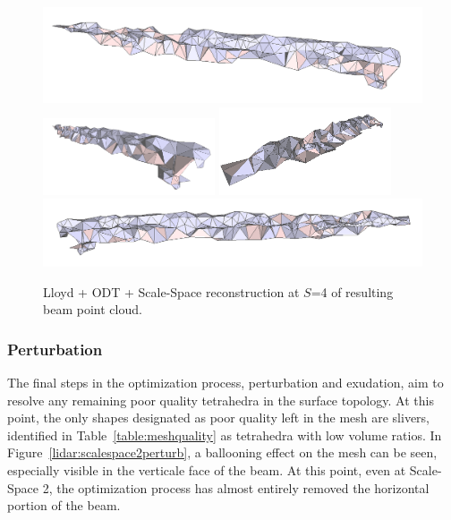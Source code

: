 \documentclass[12pt]{drexelthesis}
\let\Oldsubsubsection\subsubsection
\renewcommand{\subsubsection}{\FloatBarrier\Oldsubsubsection}
\begin{document}
\begin{figure}[!ht]
	\centering
		\includegraphics[width=5in]{real-lab-scans/optimizedNeat/scalespace4odt00.png}
		\includegraphics[width=2in]{real-lab-scans/optimizedNeat/scalespace4odt01.png}
		\includegraphics[width=2in]{real-lab-scans/optimizedNeat/scalespace4odt02.png}
		\includegraphics[width=5in]{real-lab-scans/optimizedNeat/scalespace4odt03.png}
		\caption[Lloyd + ODT + Scale-Space reconstruction at $S$=4 of segmented LiDAR data]{\centering Lloyd + ODT + Scale-Space reconstruction at $S$=4 of resulting beam point cloud.}
	\label{lidar:scalespace4odt}
\end{figure}

\subsubsection{Perturbation}

The final steps in the optimization process, perturbation and exudation, aim to resolve any remaining poor quality tetrahedra in the surface topology. At this point, the only shapes designated as poor quality left in the mesh are slivers, identified in Table~\ref{table:meshquality} as tetrahedra with low volume ratios. In Figure~\ref{lidar:scalespace2perturb}, a ballooning effect on the mesh can be seen, especially visible in the verticale face of the beam. At this point, even at Scale-Space 2, the optimization process has almost entirely removed the horizontal portion of the beam.
\end{document}
